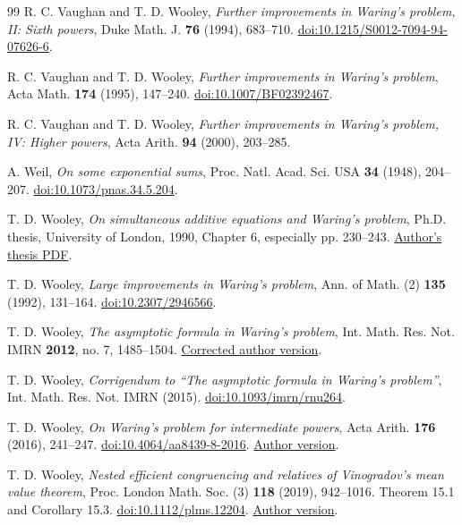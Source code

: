 \documentclass[11pt,reqno]{amsart}
\numberwithin{equation}{section}
\theoremstyle{definition}
\begin{document}
\begin{thebibliography}{99}
R. C. Vaughan and T. D. Wooley,
\emph{Further improvements in Waring's problem, II: Sixth powers},
Duke Math. J. \textbf{76} (1994), 683--710.
\href{https://doi.org/10.1215/S0012-7094-94-07626-6}{doi:10.1215/S0012-7094-94-07626-6}.

R. C. Vaughan and T. D. Wooley, \emph{Further improvements in Waring's problem},
Acta Math. \textbf{174} (1995), 147--240.
\href{https://doi.org/10.1007/BF02392467}{doi:10.1007/BF02392467}.

R. C. Vaughan and T. D. Wooley,
\emph{Further improvements in Waring's problem, IV: Higher powers},
Acta Arith. \textbf{94} (2000), 203--285.

A. Weil, \emph{On some exponential sums},
Proc. Natl. Acad. Sci. USA \textbf{34} (1948), 204--207.
\href{https://doi.org/10.1073/pnas.34.5.204}{doi:10.1073/pnas.34.5.204}.

T. D. Wooley, \emph{On simultaneous additive equations and Waring's problem},
Ph.D. thesis, University of London, 1990, Chapter 6, especially pp. 230--243.
\href{https://www.math.purdue.edu/~twooley/publ/1990\%20phd\%20thesis.pdf}{Author's thesis PDF}.

T. D. Wooley, \emph{Large improvements in Waring's problem},
Ann. of Math. (2) \textbf{135} (1992), 131--164.
\href{https://doi.org/10.2307/2946566}{doi:10.2307/2946566}.

T. D. Wooley, \emph{The asymptotic formula in Waring's problem},
Int. Math. Res. Not. IMRN \textbf{2012}, no. 7, 1485--1504.
\href{https://www.math.purdue.edu/~twooley/publ/2012asympwp.pdf}{Corrected author version}.

T. D. Wooley, \emph{Corrigendum to ``The asymptotic formula in Waring's problem''},
Int. Math. Res. Not. IMRN (2015).
\href{https://doi.org/10.1093/imrn/rnu264}{doi:10.1093/imrn/rnu264}.

T. D. Wooley, \emph{On Waring's problem for intermediate powers},
Acta Arith. \textbf{176} (2016), 241--247.
\href{https://doi.org/10.4064/aa8439-8-2016}{doi:10.4064/aa8439-8-2016}.
\href{https://www.math.purdue.edu/~twooley/publ/wpip.pdf}{Author version}.

T. D. Wooley, \emph{Nested efficient congruencing and relatives of Vinogradov's
mean value theorem}, Proc. London Math. Soc. (3) \textbf{118} (2019), 942--1016.
Theorem 15.1 and Corollary 15.3.
\href{https://doi.org/10.1112/plms.12204}{doi:10.1112/plms.12204}.
\href{https://www.math.purdue.edu/~twooley/publ/2017nec.pdf}{Author version}.


\end{thebibliography}
\end{document}

